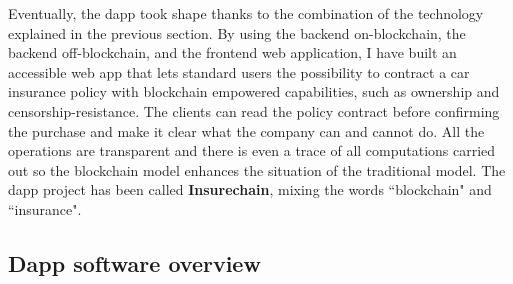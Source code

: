 {
Eventually, the dapp took shape thanks to the combination of the technology explained in the previous section. By using the backend on-blockchain, the backend off-blockchain, and the frontend web application, I have built an accessible web app that lets standard users the possibility to contract a car insurance policy with blockchain empowered capabilities, such as ownership and censorship-resistance. The clients can read the policy contract before confirming the purchase and make it clear what the company can and cannot do. All the operations are transparent and there is even a trace of all computations carried out so the blockchain model enhances the situation of the traditional model. The dapp project has been called \textbf{Insurechain}, mixing the words ``blockchain" and ``insurance".


}
\subsection{Dapp software overview}
